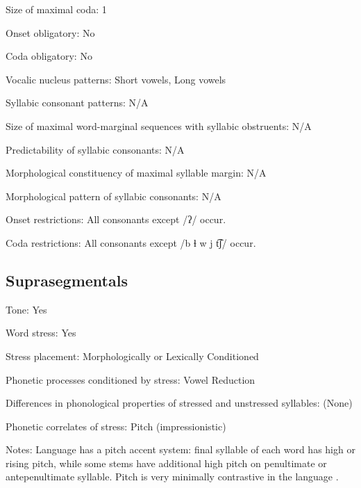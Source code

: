 {\begin{appendixdesc}
\item[Size of maximal coda:] 1

\item[Onset obligatory:] No

\item[Coda obligatory:] No

\item[Vocalic nucleus patterns:] Short vowels, Long vowels

\item[Syllabic consonant patterns:] N/A

\item[Size of maximal word-marginal sequences with syllabic obstruents:] N/A

\item[Predictability of syllabic consonants:] N/A

\item[Morphological constituency of maximal syllable margin:] N/A

\item[Morphological pattern of syllabic consonants:] N/A

\item[Onset restrictions:] All consonants except /ʔ/ occur.

\item[Coda restrictions:] All consonants except /b ɬ w j t͡ʃ/ occur.
\end{appendixdesc}
\subsection*{Suprasegmentals}
\begin{appendixdesc}
\item[Tone:] Yes

\item[Word stress:] Yes

\item[Stress placement:] Morphologically or Lexically Conditioned

\item[Phonetic processes conditioned by stress:] Vowel Reduction

\item[Differences in phonological properties of stressed and unstressed syllables:] (None)

\item[Phonetic correlates of stress:] Pitch (impressionistic)

\item[Notes:] Language has a pitch accent system: final syllable of each word has high or rising pitch, while some stems have additional high pitch on penultimate or antepenultimate syllable. Pitch is very minimally contrastive in the language \citep[17]{Broadwell2006}.
\end{appendixdesc}
}
